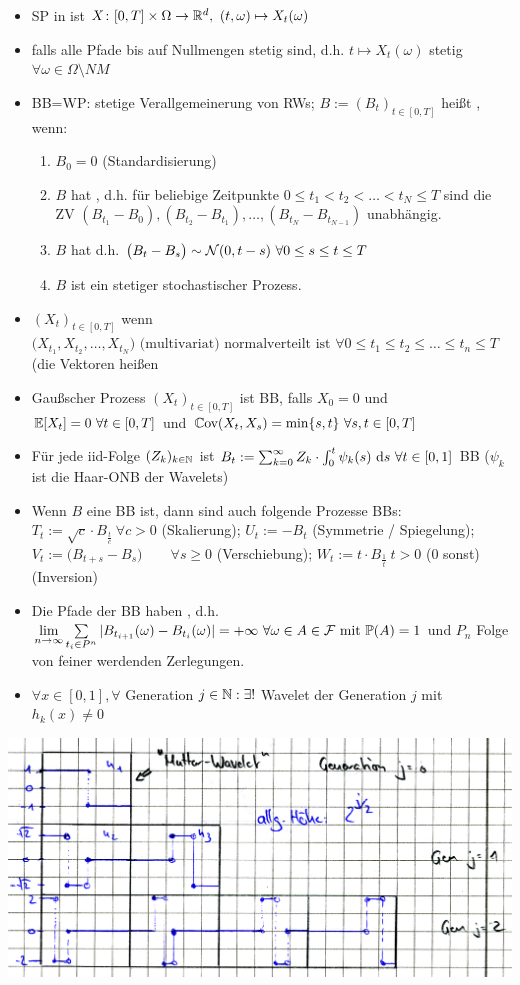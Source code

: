 \documentclass[12pt]{scrartcl}
\begin{document}
	\begin{itemize}
		\item SP in  ist $X\colon[0,T]\times\Omega\to\mathbb{R}^d,~(t,\omega)\mapsto X_t(\omega)$
		\item {} falls alle Pfade bis auf Nullmengen stetig sind, d.h. $t\mapsto X_t(\omega)$ stetig $\forall\omega\in\Omega\setminus NM$
		\item BB=WP: stetige Verallgemeinerung von RWs; $B:=(B_t)_{t\in[0,T]}$ heißt , wenn:
		\begin{enumerate}
			\item $B_0=0$ (Standardisierung)
			\item $B$ hat , d.h. für beliebige Zeitpunkte $0\leq t_1<t_2<\ldots<t_N\leq T$ sind die ZV 
			$\left(B_{t_1}-B_0\right),\left(B_{t_2}-B_{t_1}\right),\ldots,\left(B_{t_N}-B_{t_{N-1}}\right)$ unabhängig.
			\item $B$ hat  d.h.
		 $\big(B_t-B_s\big)\sim\mathcal{N}(0,t-s)~\forall 0\leq s\leq t\leq T$
			\item $B$ ist ein stetiger stochastischer Prozess.
		\end{enumerate}
		\item $(X_t)_{t\in[0,T]}$  wenn $ \Big(X_{t_1},X_{t_2},\ldots,X_{t_N}\Big)\text{ (multivariat) normalverteilt ist }\forall0\leq t_1\leq t_2\leq\ldots\leq t_n\leq T $ (die Vektoren heißen  
		\item Gaußscher Prozess $(X_t)_{t\in[0,T]}$ ist BB, falls $X_0=0$ und $\mathbb{E}[X_t]=0~\forall t\in[0,T]$ und $\mathbb{C}\text{ov}(X_t,X_s)=\min\lbrace s,t\rbrace~\forall s,t\in[0,T]$
		\item Für jede iid-Folge $(Z_k)_{k\in\mathbb{N}}$ ist $B_t:=\sum_{k=0}^\infty Z_k\cdot\int_0^t\psi_k(s)~\mathrm{d} s~\forall t\in[0,1]$ BB ($\psi_k$ ist die Haar-ONB der Wavelets)
		\item Wenn $B$ eine BB ist, dann sind auch folgende Prozesse BBs:
		$T_t:=\sqrt{c}\cdot B_{\frac{t}{c}}~\forall c>0$ (Skalierung); 
		$U_t:=-B_t$ (Symmetrie / Spiegelung);
		$V_t:=\big(B_{t+s}-B_s\big)\qquad\forall s\geq0$ (Verschiebung);
		$W_t:=t\cdot B_{\frac{1}{t}}~t>0$ (0 sonst) (Inversion)
		\item Die Pfade der BB haben , d.h.
		$\lim\limits_{n\to\infty}\sum\limits_{t_i\in P^n}|B_{t_{i+1}}(\omega)-B_{t_i}(\omega)|=+\infty~\forall\omega\in A\in\mathcal{F}\text{ mit }\mathbb{P}(A)=1$ und $P_n$ Folge von feiner werdenden Zerlegungen.
		\item {} $\forall x\in[0,1],\forall$ Generation $j\in\mathbb{N}:\exists!$ Wavelet der Generation $j$ mit $h_k(x)\neq0$
	\end{itemize}
	\includegraphics[width=1\textwidth]{./pics/WTHMscan001.png}
\end{document}
